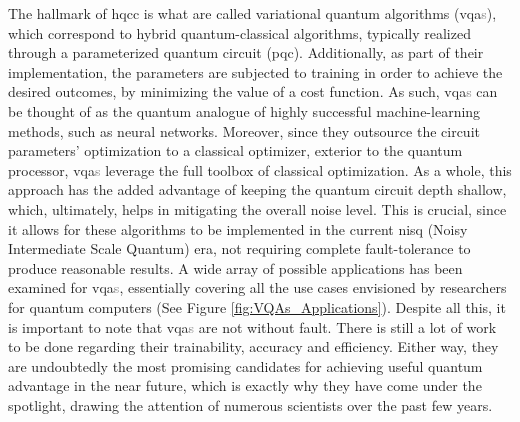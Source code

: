 


The hallmark of \acrshort{hqcc} is what are called variational quantum algorithms (\acrshort{vqa}\textcolor{gray}{s}), which correspond to hybrid quantum-classical algorithms, typically realized through a parameterized quantum circuit (\acrshort{pqc}). Additionally, as part of their implementation, the parameters are subjected to training in order to achieve the desired outcomes, by minimizing the value of a cost function. As such, \acrshort{vqa}\textcolor{gray}{s} can be thought of as the quantum analogue of highly successful machine-learning methods, such as neural networks. Moreover, since they outsource the circuit parameters' optimization to a classical optimizer, exterior to the quantum processor, \acrshort{vqa}\textcolor{gray}{s} leverage the full toolbox of classical optimization. As a whole, this approach has the added advantage of keeping the quantum circuit depth shallow, which, ultimately, helps in mitigating the overall noise level. This is crucial, since it allows for these algorithms to be implemented in the current \acrshort{nisq} (Noisy Intermediate Scale Quantum) era, not requiring complete fault-tolerance to produce reasonable results. A wide array of possible applications has been examined for \acrshort{vqa}\textcolor{gray}{s}, essentially covering all the use cases envisioned by researchers for quantum computers (See Figure \ref{fig:VQAs_Applications}). Despite all this, it is important to note that \acrshort{vqa}\textcolor{gray}{s} are not without fault. There is still a lot of work to be done regarding their trainability, accuracy and efficiency. Either way, they are undoubtedly the most promising candidates for achieving useful quantum advantage in the near future, which is exactly why they have come under the spotlight, drawing the attention of numerous scientists over the past few years.

